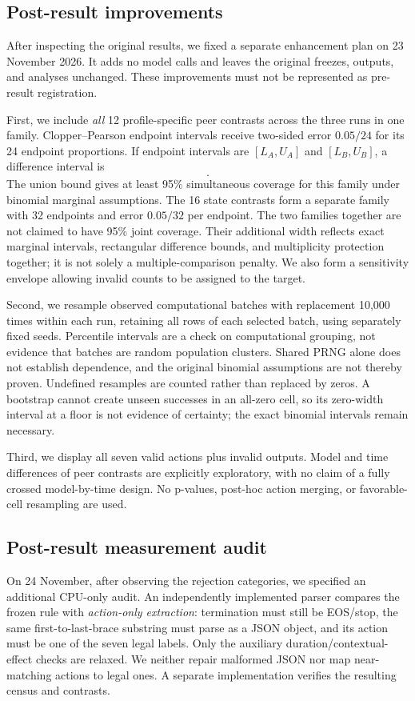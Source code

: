 \documentclass[conference]{IEEEtran}
\begin{document}
\subsection{Post-result improvements}
After inspecting the original results, we fixed a separate enhancement plan on 23 November 2026. It adds no model calls and leaves the original freezes, outputs, and analyses unchanged. These improvements must not be represented as pre-result registration.

First, we include \emph{all} 12 profile-specific peer contrasts across the three runs in one family. Clopper--Pearson endpoint intervals \cite{clopper1934} receive two-sided error $0.05/24$ for its 24 endpoint proportions. If endpoint intervals are $[L_A,U_A]$ and $[L_B,U_B]$, a difference interval is
\begin{equation}
[L_A-U_B,\;U_A-L_B].
\end{equation}
The union bound gives at least 95\% simultaneous coverage for this family under binomial marginal assumptions. The 16 state contrasts form a separate family with 32 endpoints and error $0.05/32$ per endpoint. The two families together are not claimed to have 95\% joint coverage. Their additional width reflects exact marginal intervals, rectangular difference bounds, and multiplicity protection together; it is not solely a multiple-comparison penalty. We also form a sensitivity envelope allowing invalid counts to be assigned to the target.

Second, we resample observed computational batches with replacement 10,000 times within each run, retaining all rows of each selected batch, using separately fixed seeds. Percentile intervals are a check on computational grouping, not evidence that batches are random population clusters. Shared PRNG alone does not establish dependence, and the original binomial assumptions are not thereby proven. Undefined resamples are counted rather than replaced by zeros. A bootstrap cannot create unseen successes in an all-zero cell, so its zero-width interval at a floor is not evidence of certainty; the exact binomial intervals remain necessary.

Third, we display all seven valid actions plus invalid outputs. Model and time differences of peer contrasts are explicitly exploratory, with no claim of a fully crossed model-by-time design. No p-values, post-hoc action merging, or favorable-cell resampling are used.

\subsection{Post-result measurement audit}
On 24 November, after observing the rejection categories, we specified an additional CPU-only audit. An independently implemented parser compares the frozen rule with \emph{action-only extraction}: termination must still be EOS/stop, the same first-to-last-brace substring must parse as a JSON object, and its action must be one of the seven legal labels. Only the auxiliary duration/contextual-effect checks are relaxed. We neither repair malformed JSON nor map near-matching actions to legal ones. A separate implementation verifies the resulting census and contrasts.
\end{document}
